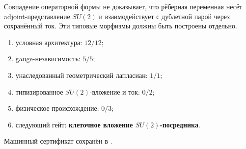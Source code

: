 \begin{nogocriterion}
Совпадение операторной формы не доказывает, что рёберная переменная несёт
adjoint-представление $SU(2)$ и взаимодействует с дублетной парой через
сохранённый ток. Эти типовые морфизмы должны быть построены отдельно.
\end{nogocriterion}

\begin{protocol}\begin{enumerate}
\item условная архитектура: \textbf{$12/12$};
\item gauge-независимость: \textbf{$5/5$};
\item унаследованный геометрический лапласиан: \textbf{$1/1$};
\item типизированное $SU(2)$-вложение и ток: \textbf{$0/2$};
\item физическое происхождение: \textbf{$0/3$};
\item следующий гейт: \textbf{клеточное вложение $SU(2)$-посредника}.
\end{enumerate}\end{protocol}

Машинный сертификат сохранён в
.